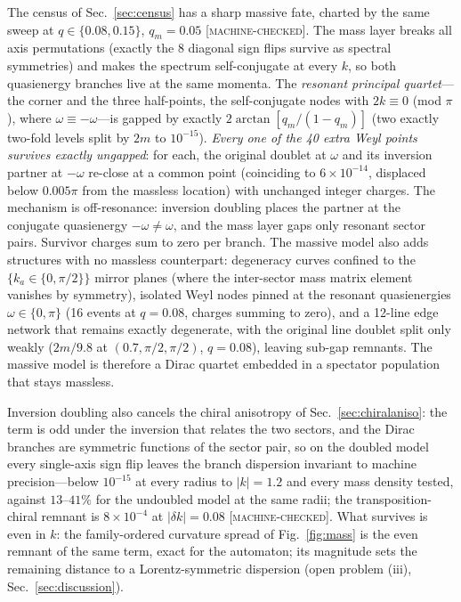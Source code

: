 \documentclass[aps,prd,twocolumn,superscriptaddress,nofootinbib,floatfix]{revtex4-2}
\newcommand{\evM}{\textnormal{\textsc{[machine-checked]}}}
\begin{document}
The census of Sec.~\ref{sec:census} has a sharp massive fate, charted
by the same sweep at $q\in\{0.08,0.15\}$, $q_m=0.05$ \evM{}. The mass
layer breaks all axis permutations (exactly the 8 diagonal sign flips
survive as spectral symmetries) and makes the spectrum self-conjugate
at every $k$, so both quasienergy branches live at the same momenta.
The \emph{resonant principal quartet}---the corner and the three
half-points, the self-conjugate nodes with $2k\equiv0$ (mod $\pi$),
where $\omega\equiv-\omega$---is gapped by exactly
$2\arctan[q_m/(1-q_m)]$ (two exactly two-fold levels split by $2m$ to
$10^{-15}$). \emph{Every one of the 40 extra Weyl points survives
exactly ungapped}: for each, the original doublet at $\omega$ and its
inversion partner at $-\omega$ re-close at a common point (coinciding
to $6\times10^{-14}$, displaced below $0.005\pi$ from the massless
location) with unchanged integer charges. The mechanism is
off-resonance: inversion doubling places the partner at the conjugate
quasienergy $-\omega\neq\omega$, and the mass layer gaps only resonant
sector pairs. Survivor charges sum to zero per branch. The massive
model also adds structures with no massless counterpart: degeneracy
curves confined to the $\{k_a\in\{0,\pi/2\}\}$ mirror planes (where the
inter-sector mass matrix element vanishes by symmetry), isolated Weyl
nodes pinned at the resonant quasienergies $\omega\in\{0,\pi\}$ (16
events at $q=0.08$, charges summing to zero), and a 12-line edge
network that remains exactly degenerate, with the original line
doublet split only weakly ($2m/9.8$ at $(0.7,\pi/2,\pi/2)$, $q=0.08$),
leaving sub-gap remnants. The massive model is therefore a Dirac
quartet embedded in a spectator population that stays massless.

Inversion doubling also cancels the chiral anisotropy of
Sec.~\ref{sec:chiralaniso}: the term is odd under the
inversion that relates the two sectors, and the Dirac branches are
symmetric functions of the sector pair, so on the doubled model every
single-axis sign flip leaves the branch dispersion invariant to
machine precision---below $10^{-15}$ at every radius to $|k|=1.2$ and
every mass density tested, against $13$--$41\%$ for the undoubled
model at the same radii; the transposition-chiral remnant is
$8\times10^{-4}$ at $|\delta k|=0.08$ \evM{}. What survives is even in
$k$: the family-ordered curvature spread of
Fig.~\ref{fig:mass} is the even remnant of the same term, exact for
the automaton; its magnitude sets the remaining distance to a
Lorentz-symmetric dispersion (open problem (iii),
Sec.~\ref{sec:discussion}).
\end{document}
